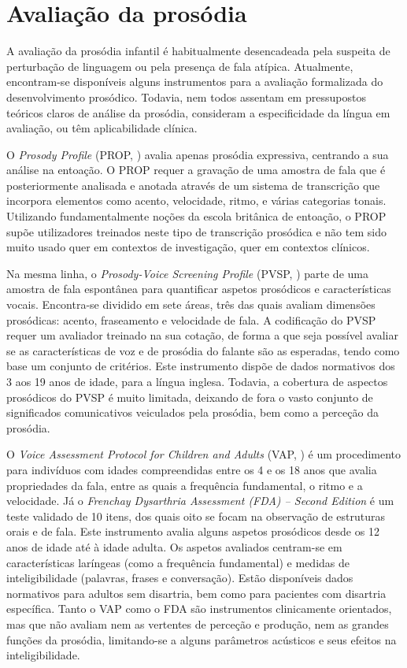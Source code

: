 \documentclass[output=paper,colorlinks,citecolor=brown,booklanguage=portuguese]{langscibook}
\begin{document}
\section{Avaliação da prosódia}\label{sec:cap8sec3}
A avaliação da prosódia infantil é habitualmente desencadeada pela suspeita de perturbação de linguagem ou pela presença de fala atípica. Atualmente, encon\-tram-se disponíveis alguns instrumentos para a avaliação formalizada do desenvolvimento prosódico. Todavia, nem todos assentam em pressupostos teóricos claros de análise da prosódia, consideram a especificidade da língua em avaliação, ou têm aplicabilidade clínica.

O \emph{Prosody Profile} (PROP, \citealp{Crystal1982}) avalia apenas prosódia expressiva, centrando a sua análise na entoação. O PROP requer a gravação de uma amostra de fala que é posteriormente analisada e anotada através de um sistema de transcrição que incorpora elementos como acento, velocidade, ritmo, e várias categorias tonais. Utilizando fundamentalmente noções da escola britânica de entoação, o PROP supõe utilizadores treinados neste tipo de transcrição prosódica e não tem sido muito usado quer em contextos de investigação, quer em contextos clínicos.

Na mesma linha, o \emph{Prosody-Voice Screening Profile} (PVSP, \citealp{Shriberg1990}) parte de uma amostra de fala espontânea para quantificar aspetos prosódicos e características vocais. Encontra-se dividido em sete áreas, três das quais avaliam dimensões prosódicas: acento, fraseamento e velocidade de fala. A codificação do PVSP requer um avaliador treinado na sua cotação, de forma a que seja possível avaliar se as características de voz e de prosódia do falante são as esperadas, tendo como base um conjunto de critérios. Este instrumento dispõe de dados normativos dos 3 aos 19 anos de idade, para a língua inglesa. Todavia, a cobertura de aspectos prosódicos do PVSP é muito limitada, deixando de fora o vasto conjunto de significados comunicativos veiculados pela prosódia, bem como a perceção da prosódia.

O \emph{ Voice Assessment Protocol for Children and Adults} (VAP, \citealp{Pindzola1987}) é um procedimento para indivíduos com idades compreendidas entre os 4 e os 18 anos que avalia propriedades da fala, entre as quais a frequência fundamental, o ritmo e a velocidade. Já o \emph{Frenchay Dysarthria Assessment (FDA) – Second Edition} \citep{Enderby2008} é um teste validado de 10 itens, dos quais oito se focam na observação de estruturas orais e de fala. Este instrumento avalia alguns aspetos prosódicos desde os 12 anos de idade até à idade adulta. Os aspetos avaliados centram-se em características laríngeas (como a frequência fundamental) e medidas de inteligibilidade (palavras, frases e conversação). Estão disponíveis dados normativos para adultos sem disartria, bem como para pacientes com disartria específica. Tanto o VAP como o FDA são instrumentos clinicamente orientados, mas que não avaliam nem as vertentes de perceção e produção, nem as grandes funções da prosódia, limitando-se a alguns parâmetros acústicos e seus efeitos na inteligibilidade.
\end{document}
